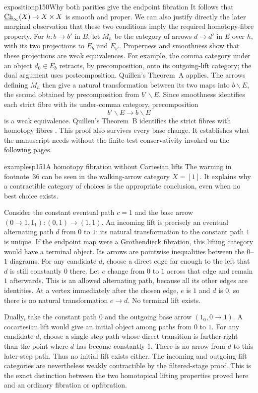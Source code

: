 \begin{dcomment}{exposition}{p150}{Why both parities give the endpoint fibration}
It follows that $\underline{\mathrm{Ch}}_\infty(X)\to X\times X$ is smooth and proper. We can also justify directly the later marginal observation that these two conditions imply the required homotopy-fibre property. For $h:b\to b'$ in $B$, let $M_h$ be the category of arrows $d\to d'$ in $E$ over $h$, with its two projections to $E_b$ and $E_{b'}$. Properness and smoothness show that these projections are weak equivalences. For example, the comma category under an object $d_0\in E_b$ retracts, by precomposition, onto its outgoing-lift category; the dual argument uses postcomposition. Quillen's Theorem~A applies. The arrows defining $M_h$ then give a natural transformation between its two maps into $b\backslash E$, the second obtained by precomposition from $b'\backslash E$. Since smoothness identifies each strict fibre with its under-comma category, precomposition
\[
 b'\backslash E\longrightarrow b\backslash E
\]
is a weak equivalence. Quillen's Theorem~B identifies the strict fibres with homotopy fibres \citep[\S1, Theorem~B]{Quillen1973}. This proof also survives every base change. It establishes what the manuscript needs without the finite-test conservativity invoked on the following pages.
\end{dcomment}


\begin{dcomment}{examples}{p151}{A homotopy fibration without Cartesian lifts}
The warning in footnote~36 can be seen in the walking-arrow category $X=[1]$. It explains why a contractible category of choices is the appropriate conclusion, even when no best choice exists.

Consider the constant eventual path $c=1$ and the base arrow $(0\to1,1_1):(0,1)\to(1,1)$. An incoming lift is precisely an eventual alternating path $d$ from $0$ to $1$: its natural transformation to the constant path $1$ is unique. If the endpoint map were a Grothendieck fibration, this lifting category would have a terminal object. Its arrows are pointwise inequalities between the $0$--$1$ diagrams. For any candidate $d$, choose a direct edge far enough to the left that $d$ is still constantly $0$ there. Let $e$ change from $0$ to $1$ across that edge and remain $1$ afterwards. This is an allowed alternating path, because all its other edges are identities. At a vertex immediately after the chosen edge, $e$ is $1$ and $d$ is $0$, so there is no natural transformation $e\to d$. No terminal lift exists.

Dually, take the constant path $0$ and the outgoing base arrow $(1_0,0\to1)$. A cocartesian lift would give an initial object among paths from $0$ to $1$. For any candidate $d$, choose a single-step path whose direct transition is farther right than the point where $d$ has become constantly $1$. There is no arrow from $d$ to this later-step path. Thus no initial lift exists either. The incoming and outgoing lift categories are nevertheless weakly contractible by the filtered-stage proof. This is the exact distinction between the two homotopical lifting properties proved here and an ordinary fibration or opfibration.
\end{dcomment}


